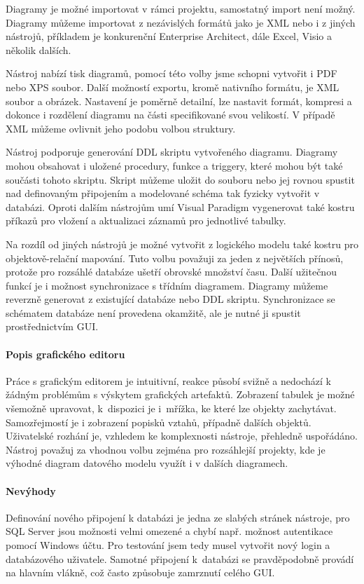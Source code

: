 \documentclass[czech,bachelor,public,dept460,male,oneside]{diploma}
\begin{document}
		Diagramy je možné importovat v rámci projektu, samostatný import není možný. Diagramy můžeme importovat z nezávislých formátů jako je XML nebo i z jiných nástrojů, příkladem je konkurenční Enterprise Architect, dále Excel, Visio a několik dalších. 
		
		Nástroj nabízí tisk diagramů, pomocí této volby jsme schopni vytvořit i PDF nebo XPS soubor. Další možností exportu, kromě nativního formátu, je XML soubor a obrázek. Nastavení je poměrně detailní, lze nastavit formát, kompresi a dokonce i rozdělení diagramu na části specifikované svou velikostí. V případě XML můžeme ovlivnit jeho podobu volbou struktury.
		
		Nástroj podporuje generování DDL skriptu vytvořeného diagramu. Diagramy mohou obsahovat i uložené procedury, funkce a triggery, které mohou být také součásti  tohoto skriptu. Skript můžeme uložit do souboru nebo jej rovnou spustit nad definovaným připojením a modelované schéma tak fyzicky vytvořit v databázi. Oproti dalším nástrojům umí Visual Paradigm vygenerovat také kostru příkazů pro vložení a aktualizaci záznamů pro jednotlivé tabulky.
		
		Na rozdíl od jiných nástrojů je možné vytvořit z logického modelu také kostru pro objektově-relační mapování. Tuto volbu považuji za jeden z největších přínosů, protože pro rozsáhlé databáze ušetří obrovské množství času. Další užitečnou funkcí je i možnost synchronizace s třídním diagramem. Diagramy můžeme reverzně generovat z existující databáze nebo DDL skriptu. Synchronizace se schématem databáze není provedena okamžitě, ale je nutné ji spustit prostřednictvím GUI. 
		
		\paragraph{Popis grafického editoru}
		Práce s grafickým editorem je intuitivní, reakce působí svižně a nedochází k žádným problémům s výskytem grafických artefaktů. Zobrazení tabulek je možné všemožně upravovat, k~dispozici je i~mřížka, ke které lze objekty zachytávat. Samozřejmostí je i zobrazení popisků vztahů, případně dalších objektů. Uživatelské rozhání je, vzhledem ke komplexnosti nástroje, přehledně uspořádáno. Nástroj považuj za vhodnou volbu zejména pro rozsáhlejší projekty, kde je výhodné diagram datového modelu využít i v dalších diagramech.
		
		\paragraph{Nevýhody}
		Definování nového připojení k databázi je jedna ze slabých stránek nástroje, pro SQL Server jsou možnosti velmi omezené a chybí např. možnost autentikace pomocí Windows účtu. Pro testování jsem tedy musel vytvořit nový login a databázového uživatele. Samotné připojení k~databázi se pravděpodobně provádí na hlavním vlákně, což často způsobuje zamrznutí celého GUI.
		
\end{document}
